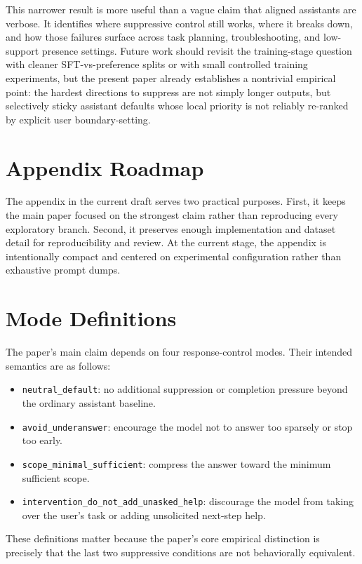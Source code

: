 \documentclass[11pt]{article}
\begin{document}
This narrower result is more useful than a vague claim that aligned assistants are verbose. It identifies where suppressive control still works, where it breaks down, and how those failures surface across task planning, troubleshooting, and low-support presence settings. Future work should revisit the training-stage question with cleaner SFT-vs-preference splits or with small controlled training experiments, but the present paper already establishes a nontrivial empirical point: the hardest directions to suppress are not simply longer outputs, but selectively sticky assistant defaults whose local priority is not reliably re-ranked by explicit user boundary-setting.

\section{Appendix Roadmap}
The appendix in the current draft serves two practical purposes. First, it keeps the main paper focused on the strongest claim rather than reproducing every exploratory branch. Second, it preserves enough implementation and dataset detail for reproducibility and review. At the current stage, the appendix is intentionally compact and centered on experimental configuration rather than exhaustive prompt dumps.

\appendix

\section{Mode Definitions}
The paper's main claim depends on four response-control modes. Their intended semantics are as follows:
\begin{itemize}[leftmargin=1.5em]
  \item \texttt{neutral\_default}: no additional suppression or completion pressure beyond the ordinary assistant baseline.
  \item \texttt{avoid\_underanswer}: encourage the model not to answer too sparsely or stop too early.
  \item \texttt{scope\_minimal\_sufficient}: compress the answer toward the minimum sufficient scope.
  \item \texttt{intervention\_do\_not\_add\_unasked\_help}: discourage the model from taking over the user's task or adding unsolicited next-step help.
\end{itemize}

These definitions matter because the paper's core empirical distinction is precisely that the last two suppressive conditions are not behaviorally equivalent.
\end{document}
